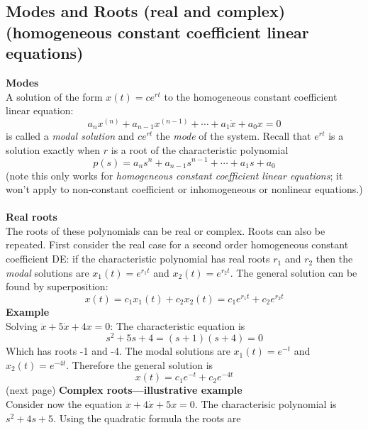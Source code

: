 \documentclass{report}
\begin{document}
\subsection{Modes and Roots (real and complex)\\(homogeneous constant coefficient linear equations)}
\textbf{Modes}\\
A solution of the form $x(t)=ce^{rt}$ to the homogeneous constant coefficient linear equation:
\begin{equation*}
a_nx^{(n)}+a_{n-1}x^{(n-1)}+\cdots+a_1\dot{x}+a_0x=0
\end{equation*}
is called a \textit{modal solution} and $ce^{rt}$ the \textit{mode} of the system. Recall that
$e^{rt}$ is a solution exactly when $r$ is a root of the characteristic polynomial
\begin{equation*}
p(s)=a_ns^n+a_{n-1}s^{n-1}+\cdots+a_1s+a_0
\end{equation*}
(note this only works for \textit{homogeneous constant coefficient linear equations}; it won't apply to
non-constant coefficient or inhomogeneous or nonlinear equations.)\\
\vspace{1mm}\\
\textbf{Real roots}\\
The roots of these polynomials can be real or complex. Roots can also be repeated. First consider the real case for
a second order homogeneous constant coefficient DE:
if the characteristic polynomial has real roots $r_1$ and $r_2$ then the \textit{modal} solutions are 
$x_1(t)=e^{r_1t}$ and $x_2(t)=e^{r_2t}$. The general solution can be found by superposition:
\begin{equation*}
x(t)=c_1x_1(t)+c_2x_2(t)=c_1e^{r_1t}+c_2e^{r_2t}
\end{equation*}
\textbf{Example}\\
Solving $\ddot{x}+5\dot{x}+4x=0$: The characteristic equation is
\begin{equation*}
s^2+5s+4=(s+1)(s+4)=0
\end{equation*}
Which has roots -1 and -4. The modal solutions are $x_1(t)=e^{-t}$ and $x_2(t)=e^{-4t}$. Therefore
the general solution is
\begin{equation*}
x(t)=c_1e^{-t}+c_2e^{-4t}
\end{equation*}
(next page)
\newpage
\noindent\textbf{Complex roots---illustrative example}\\
Consider now the equation $\ddot{x}+4\dot{x}+5x=0$. The characterisic polynomial is $s^2+4s+5$. 
Using the quadratic formula the roots are
\end{document}
